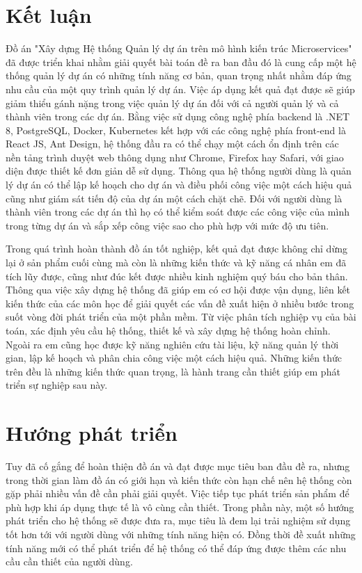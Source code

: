 \documentclass[../DoAn.tex]{subfiles}
\begin{document}
\section{Kết luận}
Đồ án "Xây dựng Hệ thống Quản lý dự án trên mô hình kiến trúc Microservices" đã được triển khai nhằm giải quyết bài toán đề ra ban đầu đó là
cung cấp một hệ thống quản lý dự án có những tính năng cơ bản, quan trọng nhất nhằm đáp ứng nhu cầu của một quy trình quản lý dự án.
Việc áp dụng kết quả đạt được sẽ giúp giảm thiểu gánh nặng trong việc quản lý dự án đối với cả người quản lý và cả thành viên trong các dự án.
Bằng việc sử dụng công nghệ phía backend là .NET 8, PostgreSQL, Docker, Kubernetes kết hợp với các công nghệ phía front-end là React JS, Ant Design,
hệ thống đầu ra có thể chạy một cách ổn định trên các nền tảng trình duyệt web thông dụng như Chrome, Firefox hay Safari, với giao diện được
thiết kế đơn giản dễ sử dụng. Thông qua hệ thống người dùng là quản lý dự án có thể lập kế hoạch cho dự án và điều phối công việc
một cách hiệu quả cũng như giám sát tiến độ của dự án một cách chặt chẽ. Đối với người dùng là thành viên trong các dự án thì
họ có thể kiểm soát được các công việc của mình trong từng dự án và sắp xếp công việc sao cho phù hợp với mức độ ưu tiên.

Trong quá trình hoàn thành đồ án tốt nghiệp, kết quả đạt được không chỉ dừng lại ở sản phẩm cuối cùng mà còn là những kiến thức và kỹ năng
cá nhân em đã tích lũy được, cũng như đúc kết được nhiều kinh nghiệm quý báu cho bản thân. Thông qua việc xây dựng hệ thống đã giúp em có
cơ hội được vận dụng, liên kết kiến thức của các môn học để giải quyết các vấn đề xuất hiện ở nhiều bước trong suốt vòng đời phát triển của
một phần mềm. Từ việc phân tích nghiệp vụ của bài toán, xác định yêu cầu hệ thống, thiết kế và xây dựng hệ thống hoàn chỉnh.
Ngoài ra em cũng học được kỹ năng nghiên cứu tài liệu, kỹ năng quản lý thời gian, lập kế hoạch và phân chia công việc một cách hiệu quả.
Những kiến thức trên đều là những kiến thức quan trọng, là hành trang cần thiết giúp em phát triển sự nghiệp sau này.

\section{Hướng phát triển}
Tuy đã cố gắng để hoàn thiện đồ án và đạt được mục tiêu ban đầu đề ra, nhưng trong thời gian làm đồ án có giới hạn và kiến thức còn hạn chế
nên hệ thống còn gặp phải nhiều vấn đề cần phải giải quyết. Việc tiếp tục phát triển sản phẩm để phù hợp khi áp dụng thực tế là vô cùng cần thiết.
Trong phần này, một số hướng phát triển cho hệ thống sẽ được đưa ra, mục tiêu là đem lại trải nghiệm sử dụng tốt hơn tới với người dùng với
những tính năng hiện có. Đồng thời đề xuất những tính năng mới có thể phát triển để hệ thống có thể đáp ứng được thêm các nhu cầu
cần thiết của người dùng.
\end{document}
